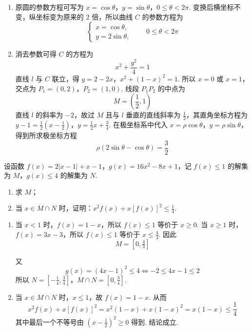 \begin{solution}
\begin{enumerate}
\item
原圆的参数方程可写为
\(x=\cos\theta\)，\(y=\sin\theta\)，\(0\leqslant\theta<2\pi\).
变换后横坐标不变，纵坐标变为原来的 \(2\) 倍，所以曲线 \(C\) 的参数方程为
\[
\begin{cases}
x=\cos\theta,\\
y=2\sin\theta,
\end{cases}
\qquad 0\leqslant\theta<2\pi
\]

\item
消去参数可得 \(C\) 的方程为
\[
x^2+\frac{y^2}{4}=1
\]
直线 \(l\) 与 \(C\) 联立，得
\(y=2-2x\)，\(x^2+(1-x)^2=1\).
所以 \(x=0\) 或 \(x=1\)，交点为
\(P_1=(0,2)\)，\(P_2=(1,0)\).
线段 \(P_1P_2\) 的中点为
\[
M=\left(\frac12,1\right)
\]
直线 \(l\) 的斜率为 \(-2\)，故过 \(M\) 且与 \(l\) 垂直的直线斜率为 \(\frac12\)，其直角坐标方程为
\(y-1=\frac12\left(x-\frac12\right)\)，\(y=\frac12x+\frac34\).
在极坐标系中代入 \(x=\rho\cos\theta\)，\(y=\rho\sin\theta\)，得到所求极坐标方程
\[
\rho\left(2\sin\theta-\cos\theta\right)=\frac32
\]
\end{enumerate}
\end{solution}

\begin{problem}
设函数 \( f(x) = 2|x - 1| + x - 1 \)，\( g(x) = 16x^{2} - 8x + 1 \)，记 \( f(x) \leqslant 1 \) 的解集为 \(M\)，\( g(x) \leqslant 4 \) 的解集为 \(N\).

\begin{enumerate}
\item 求 \(M\)；
\item 当 \(x \in M \cap N\) 时，证明：\(x^{2}f(x) + x[f(x)]^{2} \leqslant \frac{1}{4}\).
\end{enumerate}
\end{problem}

\begin{solution}
\begin{enumerate}
\item
当 \(x<1\) 时，\(f(x)=1-x\)，所以 \(f(x)\leqslant1\) 等价于 \(x\geqslant0\). 当 \(x\geqslant1\) 时，\(f(x)=3x-3\)，所以 \(f(x)\leqslant1\) 等价于 \(x\leqslant\frac43\). 因此
\[
M=[0,\tfrac43]
\]

又
\[
g(x)=(4x-1)^2\leqslant4
\Longleftrightarrow -2\leqslant4x-1\leqslant2
\]
所以
\(N=\left[-\frac14,\frac34\right]\)，\(M\cap N=\left[0,\frac34\right]\).
\item
当 \(x\in M\cap N\) 时，\(x\leqslant1\)，故 \(f(x)=1-x\). 从而
\[
x^2f(x)+x[f(x)]^2
=x^2(1-x)+x(1-x)^2
=x(1-x)
\leqslant\frac14
\]
其中最后一个不等号由 \(\left(x-\frac12\right)^2\geqslant0\) 得到. 结论成立.
\end{enumerate}
\end{solution}
